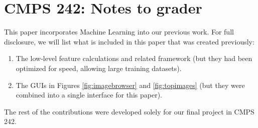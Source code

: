 \documentclass[11pt,letter]{article}
\begin{document}
\begin{figure*}[h!]
  \centering
  \caption{This is a quick view of the top twelve images, as rated by the application.}
  \label{fig:topimages}
\end{figure*}

\section{CMPS 242: Notes to grader}
This paper incorporates Machine Learning into our previous work. For full disclosure, we will list what is included in this paper that was created previously:

\begin{enumerate}
\item The low-level feature calculations and related framework (but they had been optimized for speed, allowing large training datasets).
\item The GUIs in Figures \ref{fig:imagebrowser} and \ref{fig:topimages} (but they were combined into a single interface for this paper).
\end{enumerate}

The rest of the contributions were developed solely for our final project in CMPS 242.



\end{document}

